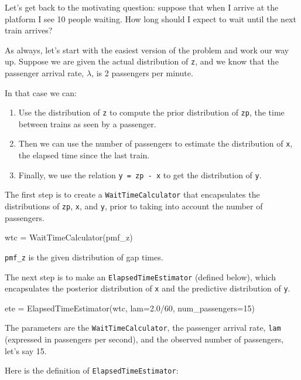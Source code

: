 \documentclass[12pt]{book}
\theoremstyle{exercise}
\begin{document}
Let's get back to the motivating question: suppose that when
I arrive at the platform I see 10 people waiting.
How long should I expect to wait until the next train arrives?

As always, let's start with the easiest version of the problem
and work our way up.  Suppose we are given the actual distribution of
{\tt z}, and we know that the passenger arrival rate,
$\lambda$, is 2 passengers per minute.

In that case we can:

\begin{enumerate}

\item Use the distribution of {\tt z} to compute
the prior distribution of {\tt zp}, the time between trains
as seen by a passenger.

\item Then we can use the number of passengers to estimate the distribution
of {\tt x}, the elapsed time since the last train.

\item Finally, we use the relation {\tt y = zp - x} to get the
distribution of {\tt y}.

\end{enumerate}

The first step is to create a {\tt WaitTimeCalculator} that
encapsulates the distributions of {\tt zp}, {\tt x},
and {\tt y}, prior to taking into account the number of
passengers.

\begin{code}
    wtc = WaitTimeCalculator(pmf_z)
\end{code}

\verb"pmf_z" is the given distribution of gap times.

The next step is to make an {\tt ElapsedTimeEstimator} (defined
below), which encapsulates the posterior distribution of {\tt x} and
the predictive distribution of {\tt y}.

\begin{code}
    ete = ElapsedTimeEstimator(wtc,
                               lam=2.0/60,
                               num_passengers=15)
\end{code}

The parameters are the {\tt WaitTimeCalculator}, the passenger
arrival rate, {\tt lam} (expressed in passengers per second),
and the observed number of passengers, let's say 15.

Here is the definition of {\tt ElapsedTimeEstimator}:
\end{document}

